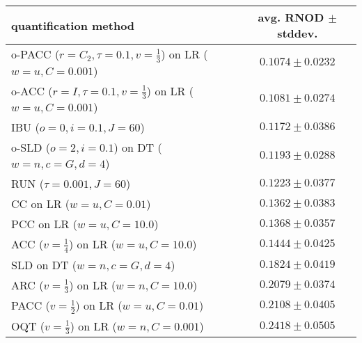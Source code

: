 \begin{tabular}{lc}
  \toprule
  quantification method & avg. RNOD $\pm$ stddev. \\
  \midrule
  o-PACC ($r=C_2, \tau=0.1, v=\frac{1}{3}$) on LR ($w=u, C=0.001$) & $\mathbf{0.1074 \pm 0.0232}$ \\
  o-ACC ($r=I, \tau=0.1, v=\frac{1}{3}$) on LR ($w=u, C=0.001$) & $\mathbf{0.1081 \pm 0.0274}$ \\
  IBU ($o=0, i=0.1, J=60$) & $0.1172 \pm 0.0386$ \\
  o-SLD ($o=2, i=0.1$) on DT ($w=n, c=G, d=4$) & $0.1193 \pm 0.0288$ \\
  RUN ($\tau=0.001, J=60$) & $0.1223 \pm 0.0377$ \\
  CC on LR ($w=u, C=0.01$) & $0.1362 \pm 0.0383$ \\
  PCC on LR ($w=u, C=10.0$) & $0.1368 \pm 0.0357$ \\
  ACC ($v=\frac{1}{4}$) on LR ($w=u, C=10.0$) & $0.1444 \pm 0.0425$ \\
  SLD on DT ($w=n, c=G, d=4$) & $0.1824 \pm 0.0419$ \\
  ARC ($v=\frac{1}{3}$) on LR ($w=n, C=10.0$) & $0.2079 \pm 0.0374$ \\
  PACC ($v=\frac{1}{2}$) on LR ($w=u, C=0.01$) & $0.2108 \pm 0.0405$ \\
  OQT ($v=\frac{1}{3}$) on LR ($w=n, C=0.001$) & $0.2418 \pm 0.0505$ \\
  \bottomrule
\end{tabular}
